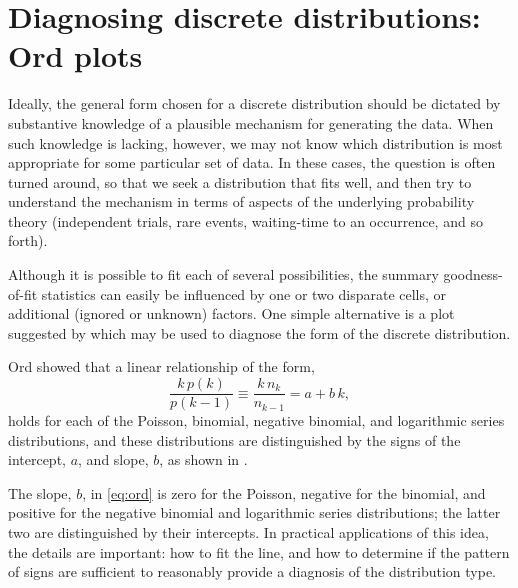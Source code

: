 \documentclass[11pt]{book}
\begin{document}

\section{Diagnosing discrete distributions: Ord plots}\label{sec:discrete-ord}

Ideally, the general form chosen for a discrete distribution should
be dictated by substantive knowledge of a plausible mechanism
for generating the data.
When such knowledge is lacking, however,
we may not know which distribution is most appropriate for
some particular set of data.
In these cases, the question is often turned around, so that we seek
a distribution that fits well, and then try to understand the mechanism
in terms of aspects of the underlying probability theory (independent trials,
rare events, waiting-time to an occurrence, and so forth).

Although it is possible to fit each of several possibilities,
the summary goodness-of-fit statistics can easily be influenced by
one or two disparate cells, or additional (ignored or unknown) factors.
One simple alternative is a plot suggested by
\citet{Ord:67} which may be used to diagnose
the form of the discrete distribution.  

Ord showed that a linear
relationship of the form,
\begin{equation} \label{eq:ord}
  \frac{ k \,  p(k) } { p(k-1) }
\equiv \frac{ k \,  n_k } { n_{k-1} }
 = a  +  b \,  k \comma
\end{equation}
holds for each of the Poisson, binomial, negative binomial, and
logarithmic series distributions, and these distributions are
distinguished by the signs of the intercept,
$a$, and slope, $b$, as shown in
.


The slope, \(b\),
in \eqref{eq:ord} is zero for the
Poisson, negative for the binomial, and positive for the negative
binomial and logarithmic series distributions; the latter two are
distinguished by their intercepts. In practical applications of this
idea, the details are important:  how to fit the line, and how to determine
if the pattern of signs are sufficient to reasonably provide a
diagnosis of the distribution type.
\end{document}
